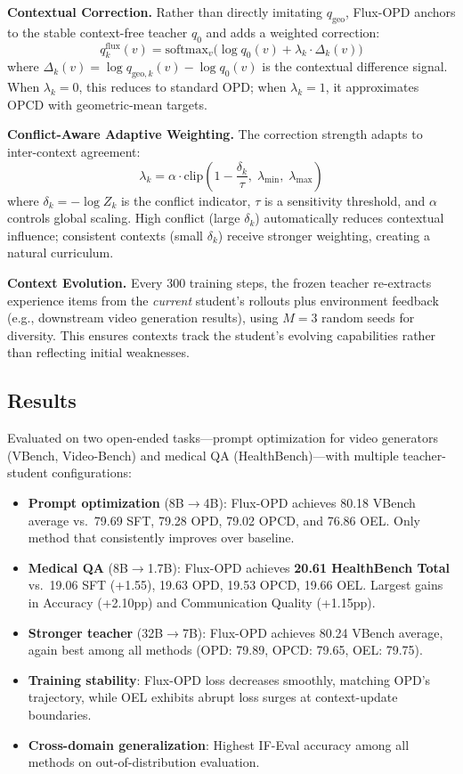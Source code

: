 \documentclass[11pt,a4paper]{article}
\begin{document}
\textbf{Contextual Correction.} Rather than directly imitating $q_{\mathrm{geo}}$, Flux-OPD anchors to the stable context-free teacher $q_0$ and adds a weighted correction:
\begin{equation}
    q^{\mathrm{flux}}_k(v) = \mathrm{softmax}_v\!\big(\log q_0(v) + \lambda_k \cdot \Delta_k(v)\big)
\end{equation}
where $\Delta_k(v) = \log q_{\mathrm{geo},k}(v) - \log q_0(v)$ is the contextual difference signal. When $\lambda_k = 0$, this reduces to standard OPD; when $\lambda_k = 1$, it approximates OPCD with geometric-mean targets.

\textbf{Conflict-Aware Adaptive Weighting.} The correction strength adapts to inter-context agreement:
\begin{equation}
    \lambda_k = \alpha \cdot \mathrm{clip}\!\left(1 - \frac{\delta_k}{\tau},\; \lambda_{\min},\; \lambda_{\max}\right)
\end{equation}
where $\delta_k = -\log Z_k$ is the conflict indicator, $\tau$ is a sensitivity threshold, and $\alpha$ controls global scaling. High conflict (large $\delta_k$) automatically reduces contextual influence; consistent contexts (small $\delta_k$) receive stronger weighting, creating a natural curriculum.

\textbf{Context Evolution.} Every 300 training steps, the frozen teacher re-extracts experience items from the \emph{current} student's rollouts plus environment feedback (e.g., downstream video generation results), using $M = 3$ random seeds for diversity. This ensures contexts track the student's evolving capabilities rather than reflecting initial weaknesses.

\subsection{Results}
Evaluated on two open-ended tasks---prompt optimization for video generators (VBench, Video-Bench) and medical QA (HealthBench)---with multiple teacher-student configurations:
\begin{itemize}
    \item \textbf{Prompt optimization} (8B$\to$4B): Flux-OPD achieves 80.18 VBench average vs.\ 79.69 SFT, 79.28 OPD, 79.02 OPCD, and 76.86 OEL. Only method that consistently improves over baseline.
    \item \textbf{Medical QA} (8B$\to$1.7B): Flux-OPD achieves \textbf{20.61 HealthBench Total} vs.\ 19.06 SFT (+1.55), 19.63 OPD, 19.53 OPCD, 19.66 OEL. Largest gains in Accuracy (+2.10pp) and Communication Quality (+1.15pp).
    \item \textbf{Stronger teacher} (32B$\to$7B): Flux-OPD achieves 80.24 VBench average, again best among all methods (OPD: 79.89, OPCD: 79.65, OEL: 79.75).
    \item \textbf{Training stability}: Flux-OPD loss decreases smoothly, matching OPD's trajectory, while OEL exhibits abrupt loss surges at context-update boundaries.
    \item \textbf{Cross-domain generalization}: Highest IF-Eval accuracy among all methods on out-of-distribution evaluation.
\end{itemize}
\end{document}
